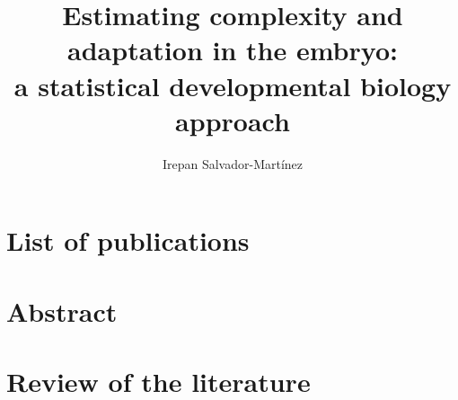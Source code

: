 \documentclass[officiallayout]{tktla_modified}
\title{\hfill\break \hfill\break   %
Estimating complexity and adaptation 
in the embryo:
\\ a statistical developmental biology approach
}
\author{Irepan Salvador-Mart\'inez}
\begin{document}
\frontmatter

\maketitle
\makenomenclature

\begin{acknowledgements}
	
\end{acknowledgements}

\renewcommand{\baselinestretch}{0.85}\small
\tableofcontents
\renewcommand{\baselinestretch}{1.0}\normalsize

\mainmatter



\chapter*{List of publications}
	

\setlength{\nomitemsep}{-\parsep}
\printnomenclature


\chapter*{Abstract}
	
\newpage
\mbox{}

\chapter{Review of the literature}
\end{document}
